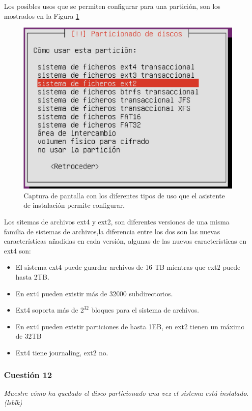 Los posibles usos que se permiten configurar para una partición, son los mostrados en la Figura \ref{fig2}
\begin{figure}[H]
    \begin{center}
        \includegraphics[scale=0.5]{Imagenes/tipos_usos_particiones.eps}
        \caption{Captura de pantalla con los diferentes tipos de uso que el asistente de instalación permite configurar.}
        \label{fig2}
    \end{center}
\end{figure}

Los sitemas de archivos ext4 y ext2, son diferentes versiones de una misma familia de sistemas de archivos,la diferencia entre los dos son las nuevas características añadidas en cada versión, algunas de las nuevas características en ext4 son:\cite{ext} \cite{ext1}
\begin{itemize}
    \item El sistema ext4 puede guardar archivos de 16 TB mientras que ext2 puede hasta 2TB.
    \item En ext4 pueden existir más de  32000 subdirectorios.
    \item Ext4 soporta más de $ 2^{32} $ bloques para el sistema de archivos.
    \item En ext4 pueden existir particiones de hasta 1EB, en ext2 tienen un máximo de 32TB
    \item Ext4 tiene journaling, ext2 no.
\end{itemize}

\subsubsection{Cuestión 12}
\textit{Muestre cómo ha quedado el disco particionado una vez el sistema está instalado. (lsblk)} \newline

